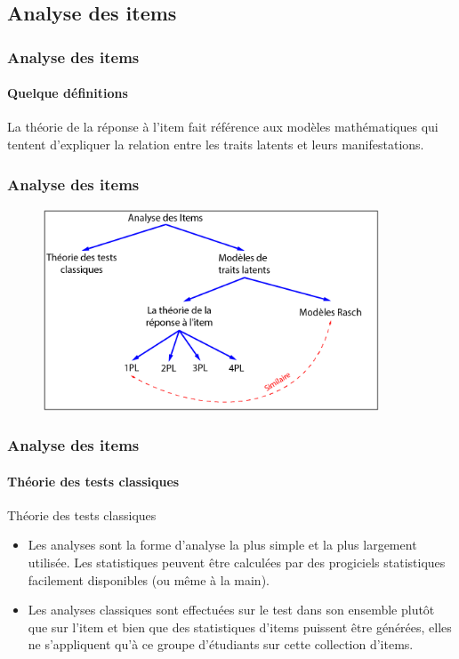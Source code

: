 \documentclass[aspectratio=169,professionalfonts, 12pt]{beamer}
\begin{document}
\subsection{Analyse des items}

\begin{frame}
  \frametitle{Analyse des items}
  \framesubtitle{Quelque définitions}
  \justifying 
  \begin{minipage}{\textwidth}
  \begin{block}{}
    La théorie de la réponse à l'item fait référence aux modèles mathématiques qui tentent d'expliquer la relation entre les traits latents et leurs manifestations.
  \end{block}


  \end{minipage} 
\end{frame}

\begin{frame}
  \frametitle{Analyse des items}
  \justifying 
  \begin{minipage}{\textwidth}
  \begin{figure}[H]
      \includegraphics[height=6cm]{images/etat_art/items_analysis.png}
  \end{figure}
  \end{minipage}
\end{frame}


\begin{frame}
  \frametitle{Analyse des items}
  \framesubtitle{Théorie des tests classiques}
  \justifying 
  \begin{minipage}{\textwidth}
  \begin{block}{Théorie des tests classiques}
    \begin{itemize}
      \item	Les analyses sont la forme d'analyse la plus simple et la plus largement utilisée. Les statistiques peuvent être calculées par des progiciels statistiques facilement disponibles (ou même à la main).
      \item	Les analyses classiques sont effectuées sur le test dans son ensemble plutôt que sur l'item et bien que des statistiques d'items puissent être générées, elles ne s'appliquent qu'à ce groupe d'étudiants sur cette collection d'items. 
    \end{itemize}
  \end{block}  
  \end{minipage} 
\end{frame}
\end{document}
